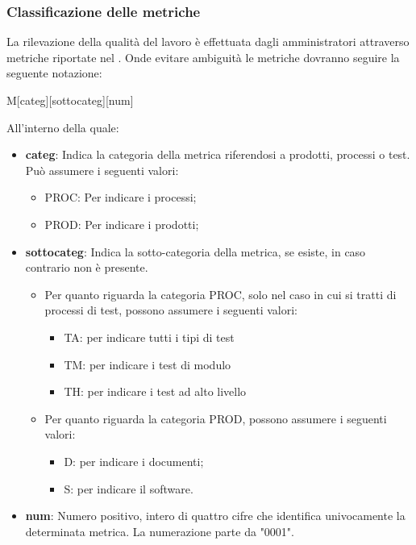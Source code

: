 \subsubsection{Classificazione delle metriche}
La rilevazione della qualità del lavoro è effettuata dagli amministratori attraverso metriche riportate nel \PdQ. Onde evitare ambiguità le metriche dovranno seguire la seguente notazione:
    \begin{center}
        M[categ][sottocateg][num]
    \end{center}
All'interno della quale:
    \begin{itemize}
        \item \textbf{categ}: Indica la categoria della metrica riferendosi a prodotti, processi o test. Può assumere i seguenti valori:
            \begin{itemize}
                \item PROC: Per indicare i processi;
                \item PROD: Per indicare i prodotti;
            \end{itemize}
        \item \textbf{sottocateg}: Indica la sotto-categoria della metrica, se esiste, in caso contrario non è presente.
            \begin{itemize}
                \item Per quanto riguarda la categoria PROC, solo nel caso in cui si tratti di processi di test, possono assumere i seguenti valori:
                    \begin{itemize}
                        \item TA: per indicare tutti i tipi di test
                        \item TM: per indicare i test di modulo
                        \item TH: per indicare i test ad alto livello
                    \end{itemize}
                \item Per quanto riguarda la categoria PROD, possono assumere i seguenti valori:
                    \begin{itemize}
                        \item D: per indicare i documenti;
                        \item S: per indicare il software.
                    \end{itemize}
            \end{itemize}

        \item \textbf{num}: Numero positivo, intero di quattro cifre che identifica univocamente la determinata metrica. La numerazione parte da "0001".
    \end{itemize}

